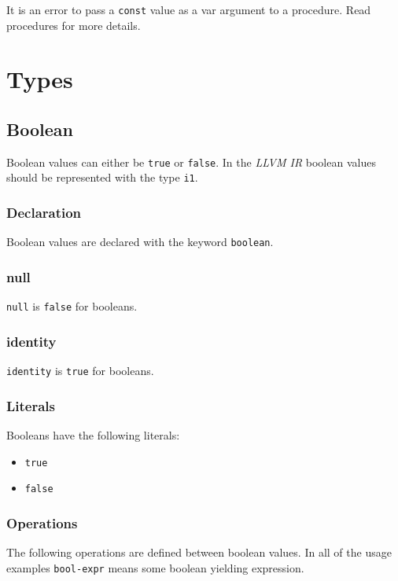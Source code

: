 \documentclass{article}
\begin{document}
	It is an error to pass a \texttt{const} value as a var argument to a procedure.  Read procedures for more details.


\section{Types}\label{sec:types}
	\subsection{Boolean}\label{sec:boolean}

		Boolean values can either be \texttt{true} or \texttt{false}. In the \textit{LLVM IR} boolean values should be
		represented with the type \texttt{i1}.

	\subsubsection{Declaration}

		Boolean values are declared with the keyword \texttt{boolean}.

	\subsubsection{null}

		\texttt{null} is \texttt{false} for booleans.

	\subsubsection{identity}

		\texttt{identity} is \texttt{true} for booleans.

	\subsubsection{Literals}

		Booleans have the following literals:

		\begin{itemize}
			\item \texttt{true}
			\item \texttt{false}
		\end{itemize}

	\subsubsection{Operations}

		The following operations are defined between boolean values. In all of  the usage examples \texttt{bool-expr}
		means some boolean yielding expression.
\end{document}

